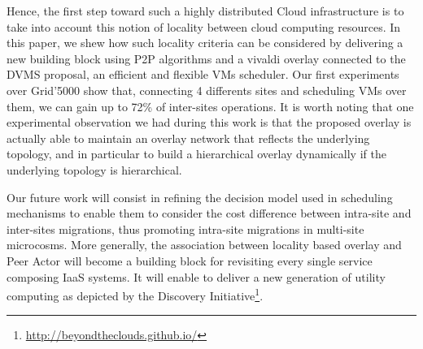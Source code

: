 Hence, the first step toward such a highly distributed Cloud infrastructure is to take
into account this notion of locality between cloud computing resources. In this paper, we
shew how such locality criteria can be considered by delivering a new building block using
P2P algorithms and a vivaldi overlay connected to the DVMS proposal, an efficient and
flexible VMs scheduler. Our first experiments over Grid'5000 show that, connecting 4
differents sites and scheduling VMs over them, we can gain up to 72\% of inter-sites
operations. It is worth noting that one experimental observation we had during this work
is that the proposed overlay is actually able to maintain an overlay network that
reflects the underlying topology, and in particular to build a hierarchical overlay
dynamically if the underlying topology is hierarchical.

Our future work will consist in refining the decision model used in scheduling mechanisms
to enable them to consider the cost difference between intra-site and inter-sites
migrations, thus promoting intra-site migrations in multi-site microcosms. More generally,
the association between locality based overlay and Peer Actor will become a building block
for revisiting every single service composing IaaS systems. It will enable to deliver a
new generation of utility computing as depicted by the Discovery
Initiative\footnote{\url{http://beyondtheclouds.github.io/}}.

